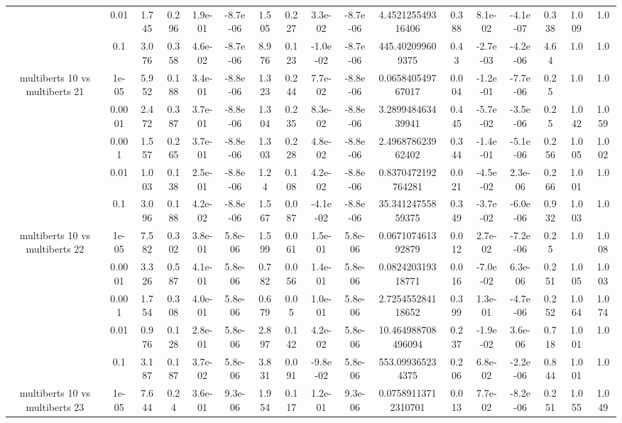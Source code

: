 \begin{tabular}{|c|c|c|c|c|c|c|c|c|c|c|c|c|c|c|c|c|}
 & 0.01 & 1.745 & 0.296 & 1.9e-01 & -8.7e-06 & 1.505 & 0.227 & 3.3e-02 & -8.7e-06 & 4.452125549316406 & 0.388 & 8.1e-02 & -4.1e-07 & 0.338 & 1.009 & 1.0 \\
 & 0.1 & 3.076 & 0.358 & 4.6e-02 & -8.7e-06 & 8.976 & 0.123 & -1.0e-02 & -8.7e-06 & 445.402099609375 & 0.43 & -2.7e-03 & -4.2e-06 & 4.64 & 1.0 & 1.0 \\
\hline
\multirow{5}{*}{multiberts 10 vs multiberts 21} & 1e-05 & 5.952 & 0.188 & 3.4e-01 & -8.8e-06 & 1.323 & 0.244 & 7.7e-02 & -8.8e-06 & 0.065840549767017 & 0.004 & -1.2e-01 & -7.7e-06 & 0.25 & 1.0 & 1.0 \\
 & 0.0001 & 2.472 & 0.387 & 3.7e-01 & -8.8e-06 & 1.304 & 0.235 & 8.3e-02 & -8.8e-06 & 3.289948463439941 & 0.445 & -5.7e-02 & -3.5e-06 & 0.25 & 1.042 & 1.059 \\
 & 0.001 & 1.557 & 0.265 & 3.7e-01 & -8.8e-06 & 1.303 & 0.228 & 4.8e-02 & -8.8e-06 & 2.496878623962402 & 0.344 & -1.4e-01 & -5.1e-06 & 0.256 & 1.005 & 1.002 \\
 & 0.01 & 1.003 & 0.138 & 2.5e-01 & -8.8e-06 & 1.24 & 0.108 & 4.2e-02 & -8.8e-06 & 0.8370472192764281 & 0.021 & -4.5e-02 & 2.3e-06 & 0.266 & 1.001 & 1.0 \\
 & 0.1 & 3.096 & 0.188 & 4.2e-02 & -8.8e-06 & 1.567 & 0.087 & -4.1e-02 & -8.8e-06 & 35.34124755859375 & 0.349 & -3.7e-02 & -6.0e-06 & 0.932 & 1.003 & 1.0 \\
\hline
\multirow{5}{*}{multiberts 10 vs multiberts 22} & 1e-05 & 7.582 & 0.302 & 3.8e-01 & 5.8e-06 & 1.599 & 0.061 & 1.5e-01 & 5.8e-06 & 0.067107461392879 & 0.012 & 2.7e-02 & -7.2e-06 & 0.25 & 1.0 & 1.008 \\
 & 0.0001 & 3.326 & 0.587 & 4.1e-01 & 5.8e-06 & 0.782 & 0.056 & 1.4e-01 & 5.8e-06 & 0.082420319318771 & 0.016 & -7.0e-02 & 6.3e-06 & 0.251 & 1.005 & 1.003 \\
 & 0.001 & 1.754 & 0.308 & 4.0e-01 & 5.8e-06 & 0.679 & 0.05 & 1.0e-01 & 5.8e-06 & 2.725455284118652 & 0.399 & 1.3e-01 & -4.7e-06 & 0.252 & 1.064 & 1.074 \\
 & 0.01 & 0.976 & 0.128 & 2.8e-01 & 5.8e-06 & 2.897 & 0.142 & 4.2e-02 & 5.8e-06 & 10.464988708496094 & 0.237 & -1.9e-02 & 3.6e-06 & 0.718 & 1.001 & 1.0 \\
 & 0.1 & 3.187 & 0.187 & 3.7e-02 & 5.8e-06 & 3.831 & 0.091 & -9.8e-02 & 5.8e-06 & 553.099365234375 & 0.206 & 6.8e-02 & -2.2e-06 & 0.844 & 1.001 & 1.0 \\
\hline
\multirow{5}{*}{multiberts 10 vs multiberts 23} & 1e-05 & 7.644 & 0.24 & 3.6e-01 & 9.3e-06 & 1.954 & 0.117 & 1.2e-01 & 9.3e-06 & 0.07589113712310701 & 0.013 & 7.7e-02 & -8.2e-06 & 0.251 & 1.055 & 1.049 \\

\end{tabular}
